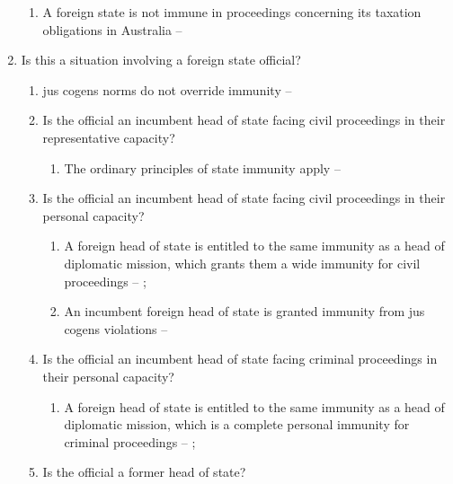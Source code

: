\begin{enumerate}
\begin{enumerate}
        \item A foreign state is not immune in proceedings concerning its taxation obligations in Australia -- 
    \end{enumerate}
    \item Is this a situation involving a foreign state official?
    \begin{enumerate}
        \item \Gls{jus cogens} norms do not override immunity -- 
        \item Is the official an incumbent head of state facing civil proceedings in their representative capacity?
        \begin{enumerate}
            \item The ordinary principles of state immunity apply -- 
        \end{enumerate}
        \item Is the official an incumbent head of state facing civil proceedings in their personal capacity?
        \begin{enumerate}
            \item A foreign head of state is entitled to the same immunity as a head of diplomatic mission, which grants them a wide immunity for civil proceedings -- ; 
            \item An incumbent foreign head of state is granted immunity from \gls{jus cogens} violations -- 
        \end{enumerate}
        \item Is the official an incumbent head of state facing criminal proceedings in their personal capacity?
        \begin{enumerate}
            \item A foreign head of state is entitled to the same immunity as a head of diplomatic mission, which is a complete personal immunity for criminal proceedings -- ; 
        \end{enumerate}
        \item Is the official a former head of state?
        \begin{enumerate}

\end{enumerate}
\end{enumerate}
\end{enumerate}
